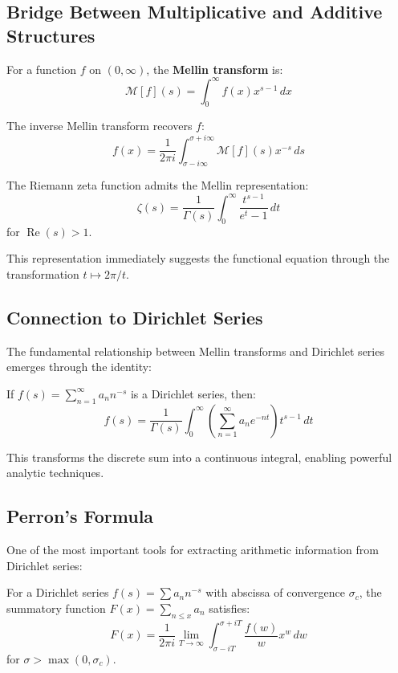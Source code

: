 \subsection{Bridge Between Multiplicative and Additive Structures}

\begin{definition}
For a function $f$ on $(0,\infty)$, the \textbf{Mellin transform} is:
$$\mathcal{M}[f](s) = \int_0^{\infty} f(x) x^{s-1} \, dx$$
\end{definition}

The inverse Mellin transform recovers $f$:
$$f(x) = \frac{1}{2\pi i} \int_{\sigma-i\infty}^{\sigma+i\infty} \mathcal{M}[f](s) x^{-s} \, ds$$

\begin{theorem}
The Riemann zeta function admits the Mellin representation:
$$\zeta(s) = \frac{1}{\Gamma(s)} \int_0^{\infty} \frac{t^{s-1}}{e^t - 1} \, dt$$
for $\operatorname{Re}(s) > 1$.
\end{theorem}

This representation immediately suggests the functional equation through the transformation $t \mapsto 2\pi/t$.

\subsection{Connection to Dirichlet Series}

The fundamental relationship between Mellin transforms and Dirichlet series emerges through the identity:

\begin{proposition}
If $f(s) = \sum_{n=1}^{\infty} a_n n^{-s}$ is a Dirichlet series, then:
$$f(s) = \frac{1}{\Gamma(s)} \int_0^{\infty} \left(\sum_{n=1}^{\infty} a_n e^{-nt}\right) t^{s-1} \, dt$$
\end{proposition}

This transforms the discrete sum into a continuous integral, enabling powerful analytic techniques.

\subsection{Perron's Formula}

One of the most important tools for extracting arithmetic information from Dirichlet series:

\begin{theorem}
For a Dirichlet series $f(s) = \sum a_n n^{-s}$ with abscissa of convergence $\sigma_c$, the summatory function $F(x) = \sum_{n \leq x} a_n$ satisfies:
$$F(x) = \frac{1}{2\pi i} \lim_{T \to \infty} \int_{\sigma-iT}^{\sigma+iT} \frac{f(w)}{w} x^w \, dw$$
for $\sigma > \max(0, \sigma_c)$.
\end{theorem}

